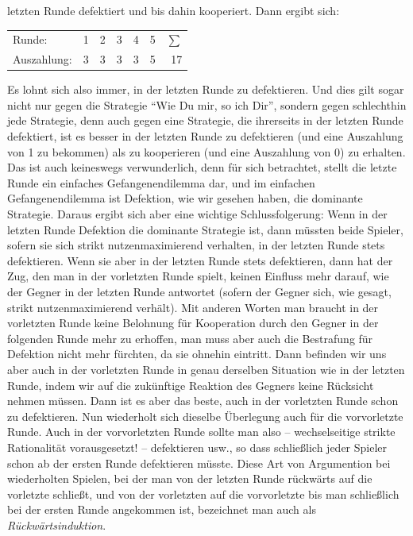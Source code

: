 letzten Runde defektiert und bis dahin kooperiert. Dann ergibt sich:
\begin{center}
\begin{tabular}{|l|c|c|c|c|c|r|}
\cline{1-7}
Runde:       & 1 & 2 & 3 & 4 & 5 & $\sum$ \\
\cline{1-7}
Auszahlung:  & 3 & 3 & 3 & 3 & 5 & 17 \\
\cline{1-7}
\end{tabular}
\end{center}
Es lohnt sich also immer, in der letzten Runde zu defektieren. Und dies gilt
sogar nicht nur gegen die Strategie "`Wie Du mir, so ich Dir"', sondern gegen
schlechthin jede Strategie, denn auch gegen eine Strategie, die ihrerseits in
der letzten Runde defektiert, ist es besser in der letzten Runde zu defektieren
(und eine Auszahlung von 1 zu bekommen) als zu kooperieren (und eine Auszahlung
von 0) zu erhalten. Das ist auch keineswegs verwunderlich, denn für sich
betrachtet, stellt die letzte Runde ein einfaches Gefangenendilemma dar, und im
einfachen Gefangenendilemma ist Defektion, wie wir gesehen haben, die dominante
Strategie. Daraus ergibt sich aber eine wichtige Schlussfolgerung: Wenn in der
letzten Runde Defektion die dominante Strategie ist, dann müssten beide
Spieler, sofern sie sich strikt nutzenmaximierend verhalten, in der letzten
Runde stets defektieren. Wenn sie aber in der letzten Runde stets defektieren,
dann hat der Zug, den man in der vorletzten Runde spielt, keinen Einfluss mehr
darauf, wie der Gegner in der letzten Runde antwortet (sofern der Gegner sich,
wie gesagt, strikt nutzenmaximierend verhält). Mit anderen Worten man braucht
in der vorletzten Runde keine Belohnung für Kooperation durch den Gegner in der 
folgenden Runde mehr zu erhoffen, man muss aber auch die Bestrafung
für Defektion nicht mehr fürchten, da sie ohnehin eintritt. Dann befinden wir
uns aber auch in der vorletzten Runde in genau derselben Situation wie in der
letzten Runde, indem wir auf die zukünftige Reaktion des Gegners keine
Rücksicht nehmen müssen. Dann ist es aber das beste, auch in der vorletzten
Runde schon zu defektieren. Nun wiederholt sich dieselbe Überlegung auch für
die vorvorletzte Runde. Auch in der vorvorletzten Runde sollte man also --
wechselseitige strikte Rationalität vorausgesetzt! -- defektieren usw., so dass
schließlich jeder Spieler schon ab der ersten Runde defektieren müsste. Diese
Art von Argumention bei wiederholten Spielen, bei der man von der letzten Runde
rückwärts auf die vorletzte schließt, und von der vorletzten auf die
vorvorletzte bis man schließlich bei der ersten Runde angekommen ist,
bezeichnet man auch als {\em Rückwärtsinduktion}.

